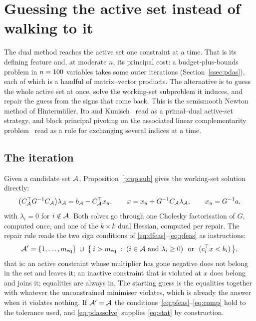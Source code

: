 \section{Guessing the active set instead of walking to it}
\label{sec:pdas}

The dual method reaches the active set one constraint at a time. That is its
defining feature and, at moderate $n$, its principal cost: a budget-plus-bounds
problem in $n = 100{}$ variables takes some \qpPdasBudgetOuter{} outer
iterations (Section~\ref{ssec:pdas}), each of which is a handful of
matrix--vector products. The alternative is to guess the whole active
set at once, solve the working-set subproblem it induces, and repair the guess
from the signs that come back. This is the semismooth Newton method of
Hinterm\"uller, Ito and Kunisch~\cite{hintermuller2002} read as a primal--dual
active-set strategy, and block principal pivoting on the associated linear
complementarity problem~\cite{judice1994,murty1988,cottle1992} read as a rule for
exchanging several indices at a time.

\subsection{The iteration}

Given a candidate set $\mathcal{A}$, Proposition~\ref{prop:sub} gives the working-set
solution directly:
\begin{equation}
  \bigl(C_{\mathcal{A}}^{\top} G^{-1} C_{\mathcal{A}}\bigr)\lambda_{\mathcal{A}}
   = b_{\mathcal{A}} - C_{\mathcal{A}}^{\top} x_u,
  \qquad
  x = x_u + G^{-1}C_{\mathcal{A}} \lambda_{\mathcal{A}},
  \qquad x_u = G^{-1}a,
  \label{eq:pdassolve}
\end{equation}
with $\lambda_i = 0$ for $i \notin \mathcal{A}$. Both solves go through one Cholesky
factorisation of $G$, computed once, and one of the $k \times k$ dual Hessian,
computed per repair. The repair rule reads the two sign conditions of
\eqref{eq:dfeas}--\eqref{eq:pfeas} as instructions:
\begin{equation}
  \mathcal{A}' = \{1,\dots,m_{\mathrm{eq}}\} \;\cup\;
  \bigl\{\, i > m_{\mathrm{eq}} \;:\;
    (i \in \mathcal{A} \text{ and } \lambda_i \ge 0)
    \ \text{ or }\
    (c_i^{\top} x < b_i) \,\bigr\},
  \label{eq:repair}
\end{equation}
that is: an active constraint whose multiplier has gone negative does not belong
in the set and leaves it; an inactive constraint that is violated at $x$ does
belong and joins it; equalities are always in. The starting guess is the
equalities together with whatever the unconstrained minimiser violates, which is
already the answer when it violates nothing. If $\mathcal{A}' = \mathcal{A}$ the
conditions~\eqref{eq:pfeas}--\eqref{eq:comp} hold to the tolerance used, and
\eqref{eq:pdassolve} supplies \eqref{eq:stat} by construction.

